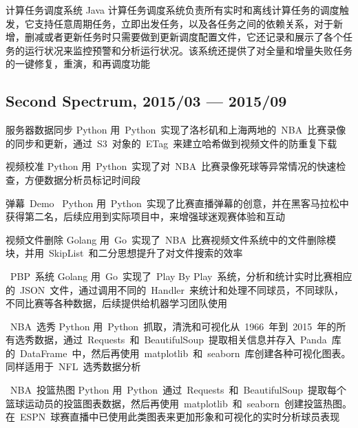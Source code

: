\documentclass[11pt,a4paper]{moderncv}
\begin{document}
\vspace*{0.2\baselineskip}
\cventry{}
{计算任务调度系统}
{Java}
{}{}
{
计算任务调度系统负责所有实时和离线计算任务的调度触发，它支持任意周期任务，立即出发任务，以及各任务之间的依赖关系，对于新增，删减或者更新任务时只需要做到更新调度配置文件，它还记录和展示了各个任务的运行状况来监控预警和分析运行状况。该系统还提供了对全量和增量失败任务的一键修复，重演，和再调度功能
}

\newpage
\subsection{Second Spectrum, 2015/03 --- 2015/09}
\renewcommand{\baselinestretch}{1.0}
\cventry{}
{服务器数据同步}
{Python}
{}{}
{
用~Python~实现了洛杉矶和上海两地的~NBA~比赛录像的同步和更新，通过~S3~对象的~ETag~来建立哈希做到视频文件的防重复下载
}

\vspace*{0.2\baselineskip}
\cventry{}
{视频校准}
{Python}
{}{}
{
用~Python~实现了对~NBA~比赛录像死球等异常情况的快速检查，方便数据分析员标记时间段
}

\vspace*{0.2\baselineskip}
\cventry{}
{弹幕~Demo~}
{Python}
{}{}
{
用~Python~实现了比赛直播弹幕的创意，并在黑客马拉松中获得第二名，后续应用到实际项目中，来增强球迷观赛体验和互动
}

\vspace*{0.2\baselineskip}
\cventry{}
{视频文件删除}
{Golang}
{}{}
{
用~Go~实现了~NBA~比赛视频文件系统中的文件删除模块，并用~SkipList~和二分思想提升了对文件搜索的效率
}

\vspace*{0.2\baselineskip}
\cventry{}
{~PBP~系统}
{Golang}
{}{}
{
用~Go~实现了~Play By Play~系统，分析和统计实时比赛相应的~JSON~文件，通过调用不同的~Handler~来统计和处理不同球员，不同球队，不同比赛等各种数据，后续提供给机器学习团队使用
}

\vspace*{0.2\baselineskip}
\cventry{}
{~NBA~选秀}
{Python}
{}{}
{
用~Python~抓取，清洗和可视化从~1966~年到~2015~年的所有选秀数据，通过~Requests~和~BeautifulSoup~提取相关信息并存入~Panda~库的~DataFrame~中，然后再使用~matplotlib~和~seaborn~库创建各种可视化图表。同样适用于~NFL~选秀数据分析
}

\vspace*{0.2\baselineskip}
\cventry{}
{~NBA~投篮热图}
{Python}
{}{}
{
用~Python~通过~Requests~和~BeautifulSoup~提取每个篮球运动员的投篮图表数据，然后再使用~matplotlib~和~seaborn~创建投篮热图。在~ESPN~球赛直播中已使用此类图表来更加形象和可视化的实时分析球员表现
}
\end{document}

